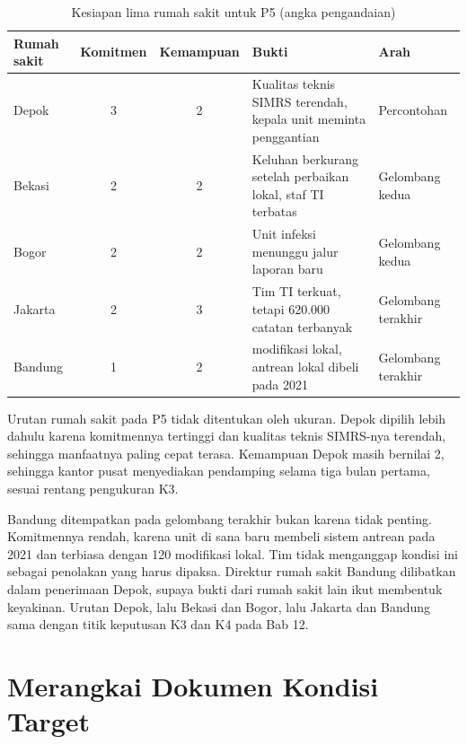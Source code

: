 \begin{table}[!htb]
  \centering
  \caption{Kesiapan lima rumah sakit untuk P5 (angka pengandaian)}
  \label{tab:ch11-kesiapan}
  \small
  \begin{tabularx}{\textwidth}{lcc>{\raggedright\arraybackslash}X>{\raggedright\arraybackslash}p{2.6cm}}
    \hline
    \textbf{Rumah sakit} & \textbf{Komitmen} & \textbf{Kemampuan} & \textbf{Bukti} & \textbf{Arah} \\ \hline
    Depok & 3 & 2 & Kualitas teknis SIMRS terendah, kepala unit meminta penggantian & Percontohan \\ \hline
    Bekasi & 2 & 2 & Keluhan berkurang setelah perbaikan lokal, staf TI terbatas & Gelombang kedua \\ \hline
    Bogor & 2 & 2 & Unit infeksi menunggu jalur laporan baru & Gelombang kedua \\ \hline
    Jakarta & 2 & 3 & Tim TI terkuat, tetapi 620.000 catatan terbanyak & Gelombang terakhir \\ \hline
    Bandung & 1 & 2 & 120 modifikasi lokal, antrean lokal dibeli pada 2021 & Gelombang terakhir \\ \hline
  \end{tabularx}
\end{table}

\begin{kasus}[title={Kasus Medikara Health: Kesiapan Menentukan Rumah Sakit Pertama}]
Urutan rumah sakit pada P5 tidak ditentukan oleh ukuran. Depok dipilih lebih dahulu karena komitmennya tertinggi dan kualitas teknis
SIMRS-nya terendah, sehingga manfaatnya paling cepat terasa. Kemampuan Depok masih bernilai 2, sehingga kantor pusat menyediakan
pendamping selama tiga bulan pertama, sesuai rentang pengukuran K3.

Bandung ditempatkan pada gelombang terakhir bukan karena tidak penting. Komitmennya rendah, karena unit di sana baru membeli sistem antrean
pada 2021 dan terbiasa dengan 120 modifikasi lokal. Tim tidak menganggap kondisi ini sebagai penolakan yang harus dipaksa. Direktur rumah sakit
Bandung dilibatkan dalam penerimaan Depok, supaya bukti dari rumah sakit lain ikut membentuk keyakinan. Urutan Depok, lalu Bekasi dan Bogor,
lalu Jakarta dan Bandung sama dengan titik keputusan K3 dan K4 pada Bab 12.
\end{kasus}

\section{Merangkai Dokumen Kondisi Target}

